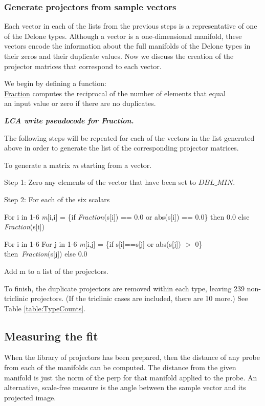 \documentclass[preprint]{iucr}              %
\begin{document}
	
	\subsubsection{Generate projectors from sample vectors\\}
	
	Each vector in each of the lists from the previous steps is a representative of one
	of the Delone types. Although a vector is a one-dimensional manifold,
	these vectors encode the information about the full manifolds of the
	Delone types in their zeros and their duplicate values. Now we 
	discuss the creation of the projector matrices that correspond
	to each vector.
	
	We begin by defining a function: \\ \relax
	\underline{Fraction} computes the reciprocal of the 
	number of elements that equal \\ \relax
	an input value or zero if there are no duplicates.
	
	\textit{\textbf{LCA write pseudocode for Fraction.}}
	
	The following steps will be repeated for each of the vectors in the
	list generated above in order to generate the list
	of the corresponding projector matrices. 
	
	To generate a matrix \textit{m} starting from a vector.
	
	Step 1: Zero any elements of the vector that have been set to $DBL\_MIN$.
	
	Step 2: For each of the six scalars
	
	For i in 1-6
	\textit{m}[i,i] = \{if \textit{Fraction}(s[i]) == 0.0 or abs(s[i]) == 0.0\} then 0.0 else \textit{Fraction}(s[i])
	
	For i in 1-6
	For j in 1-6
	\textit{m}[i,j] 	= \{if s[i]==s[j] or abs(s[j]) $>$ 0\} then~\textit{Fraction}(s[j]) else 0.0
	
	Add m to a list of the projectors.
	
	
	To finish, the duplicate projectors are removed within each type, 
	leaving 239 non-triclinic projectors. (If the triclinic cases are 
	included, there are 10 more.) See Table \ref{table:TypeCounts}.
	
	
	\subsection {Measuring the fit}
	
	When the library of projectors has been prepared, then
	the distance of any probe from each of the manifolds
	can be computed. 
	The distance from the given manifold is just
	the norm of the perp for that manifold applied to the probe.
	An alternative, scale-free measure is the angle between
	the sample vector and its projected image.
	
\end{document}
